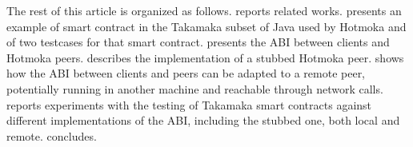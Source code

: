 The rest of this article is organized as follows.  reports
related works.  presents an example of smart contract
in the Takamaka subset of Java used by Hotmoka and of two testcases for that
smart contract.  presents the ABI between clients
and Hotmoka peers.  describes the implementation
of a stubbed Hotmoka peer.
 shows how the ABI between clients and peers can be adapted to
a remote peer, potentially running in another machine and reachable through
network calls.  reports experiments with
the testing of Takamaka smart contracts against different implementations
of the ABI, including the stubbed one, both local and remote.
 concludes.

